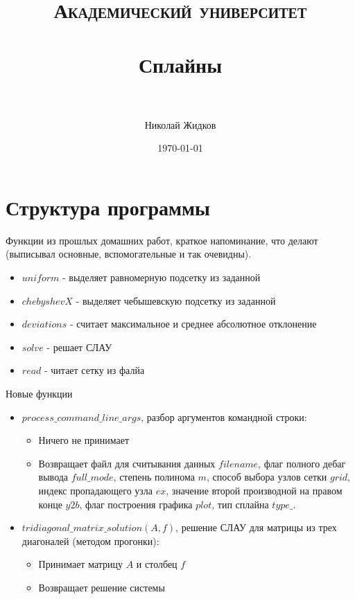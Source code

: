 \documentclass[paper=a4, fontsize=11pt]{scrartcl} %
\title{	
\normalfont \normalsize 
\textsc{Академический университет} \\ [25pt] %
\horrule{0.5pt} \\[0.4cm] %
\huge Сплайны \\ %
\horrule{2pt} \\[0.5cm] %
}
\author{Николай Жидков} %
\date{\normalsize\today} %
\numberwithin{equation}{section} %
\numberwithin{figure}{section} %
\numberwithin{table}{section} %
\begin{document}
\maketitle %


\section{Структура программы}

Функции из прошлых домашних работ, краткое напоминание, что делают (выписывал основные, вспомогательные и так очевидны).

\begin{itemize}
	\item $uniform$ - выделяет равномерную подсетку из заданной
    \item $chebyshevX$ - выделяет чебышевскую подсетку из заданной
    \item $deviations$ - считает максимальное и среднее абсолютное отклонение
    \item $solve$ - решает СЛАУ
    \item $read$ - читает сетку из фалйа
\end{itemize}

Новые функции

\begin{itemize}
	\item $process\_command\_line\_args$, разбор аргументов командной строки:
		\begin{itemize}
		\item Ничего не принимает
		\item Возвращает файл для считывания данных $filename$, флаг полного дебаг вывода $full\_mode$, степень полинома $m$, способ выбора узлов сетки $grid$, индекс пропадающего узла $ex$, значение второй производной на правом конце $y2b$, флаг построения графика $plot$, тип сплайна $type\_$.
		\end{itemize}
	\item $tridiagonal\_matrix\_solution(A, f)$, решение СЛАУ для матрицы из трех диагоналей (методом прогонки):
		\begin{itemize}
		\item Принимает матрицу $A$ и столбец $f$
		\item Возвращает решение системы
		\end{itemize}
\end{itemize}
\end{document}
